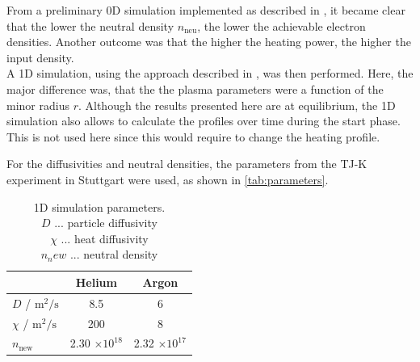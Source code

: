 


\noindent From a preliminary 0D simulation implemented as described in \cite{plasmaParameterLimitsLechte2002}, it became clear that the lower the neutral density $n_\mathrm{neu}$, the lower the achievable electron densities.
Another outcome was that the higher the heating power, the higher the input density. \\

A 1D simulation, using the approach described in \cite{birkenmaierModeling2008}, was then performed.
Here, the major difference was, that the the plasma parameters were a function of the minor radius $r$.
Although the results presented here are at equilibrium, the 1D simulation also allows to calculate the profiles over time during the start phase. This is not used here since this would require to change the heating profile.

For the diffusivities and neutral densities, the parameters from the TJ-K experiment in Stuttgart were used, as shown in \autoref{tab:parameters}.

\begin{table}[H]
  \caption{1D simulation parameters. \\
  $D$ ... particle diffusivity \\
  $\chi$ ... heat diffusivity \\
  $n_new$ ... neutral density}
  \centering
  \begin{tabular}{lSS}
                                              & {Helium}               & {Argon}                 \\
    \hline
    $D$ / $\si{\meter\squared\per\second}$    & 8.5                   & 6                     \\
    $\chi$ / $\si{\meter\squared\per\second}$ & 200                   & 8                     \\
    $n_\mathrm{new}$                          & 2.30 $\times 10^{18}$ & 2.32 $\times 10^{17}$ \\
  \end{tabular}
  \label{tab:parameters}
\end{table}

